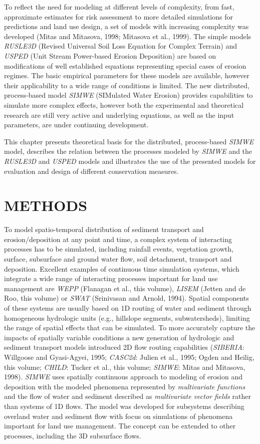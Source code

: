 \documentclass{kapedbk} %
\begin{document}
To reflect the need for modeling at different levels of
complexity, from fast, approximate estimates for risk assessment
to more detailed simulations for predictions and
land use design, a set of models with increasing complexity was developed
(Mitas and Mitasova, 1998; Mitasova et al., 1999).
The simple models {\sl RUSLE3D} 
(Revised Universal Soil Loss Equation for Complex Terrain)
 and {\sl USPED} (Unit Stream Power-based Erosion Deposition) are based on
modifications of well established equations representing
special cases of erosion regimes. The basic empirical parameters for these models
are available, however their applicability to a wide
range of conditions is limited. The new distributed,
process-based model {\sl SIMWE} (SIMulated Water Erosion)
provides capabilities to simulate more complex effects, however
both the experimental and theoretical research are still very active
and underlying equations, as well as the input parameters,
are under continuing development.

This chapter presents theoretical basis for the distributed, process-based
{\sl SIMWE} model, describes the relation between the processes modeled by
 {\sl SIMWE} and the {\sl RUSLE3D} and {\sl USPED} models and
illustrates the use of the presented models
for evaluation and design of different conservation measures.

\bigskip
\noindent
\section{METHODS}

To model spatio-temporal distribution of sediment transport and 
erosion/deposition at any point and time, 
a complex system of interacting processes has
to be simulated, including rainfall events, vegetation growth,
surface, subsurface and ground water flow, soil detachment, transport
and deposition. Excellent examples of continuous time
simulation systems, which integrate a wide range of interacting
processes important for land use management
 are {\sl WEPP} (Flanagan et al., this volume), {\sl LISEM} 
(Jetten and de Roo, this volume) or
 {\sl SWAT} (Srinivasan and Arnold, 1994).
Spatial components of these systems are usually based
on 1D routing of water and sediment through
homogeneous hydrologic units (e.g., hillslope segments, subwatersheds),
limiting the range of spatial effects that can be simulated.
To more accurately capture the impacts of spatially
variable conditions a new generation of hydrologic and sediment 
transport models introduced 2D flow routing capabilities  
({\sl SIBERIA}: Willgoose and Gyasi-Agyei, 1995; 
{\sl CASC2d}: Julien et al., 1995; Ogden and Heilig, this volume;
{\sl CHILD}: Tucker et al., this volume; 
{\sl SIMWE}: Mitas and Mitasova, 1998).
{\sl SIMWE} uses spatially continuous approach to
modeling of erosion and deposition 
with the modeled phenomena represented
by {\sl multivariate functions} and the
flow of water and sediment described as {\sl multivariate vector fields} rather
than systems of 1D flows.  The model was developed for
subsystems describing overland water and sediment flow with focus on
simulations of phenomena important for land use management.
The concept can be extended to other processes, including the 3D subsurface
flows.
\end{document}

